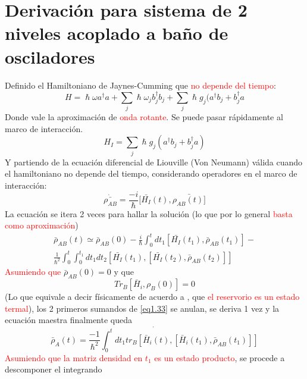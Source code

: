 \documentclass{book}
\begin{document}
\section{Derivación para sistema de 2 niveles acoplado a baño de osciladores}
Definido el Hamiltoniano de Jaynes-Cumming que \textcolor{Red}{no depende del tiempo}: 
\begin{equation}\label{eq1.30}H=\hslash\omega a^\dag a+\sum_j \hslash \omega_jb_j^\dag b_j+\sum_j \hslash g_j(a^\dag b_j+b_j^\dag a\end{equation}
Donde vale la aproximación de \textcolor{Red}{onda rotante}. Se puede pasar rápidamente al marco de interacción.
\begin{equation}\label{eq1.31}H_I=\sum_j \hslash g_j(a^\dag b_j+b_j^\dag a) \end{equation} Y partiendo de la ecuación diferencial de Liouville (Von Neumann) válida cuando el hamiltoniano no depende del tiempo, considerando operadores en el marco de interacción:
\begin{equation}\label{eq1.32}\dot{\bar{\rho_{AB}}}=\frac{-i}{\hslash}[\bar{H_I}(t),\bar{\rho_{AB}(t)]}\end{equation}
La ecuación se itera 2 veces para hallar la solución (lo que por lo general \textcolor{Red}{basta como aproximación})
\begin{equation}\label{eq1.33} \begin{aligned}\bar{\rho}_{AB}(t)\simeq\bar\rho_{AB}(0)-\frac{i}{\hslash}\int_0^t dt_1[\bar{H_I}(t_1),\bar{\rho}_{AB}(t_1)]- \\ \frac{1}{\hslash^2}\int_0^t\int_0^{t_1}dt_1dt_2[\bar{H_I}(t_1),[\bar{H_I}(t_2),\bar{\rho}_{AB}(t_2)]]\end{aligned}\end{equation}
\textcolor{Red}{Asumiendo que} $\bar{\rho}_{AB}(0)=0$ y que 
\begin{equation}\label{eq1.34}Tr_B[\bar{H}_i,\rho_B(0)]=0\end{equation}
(Lo que equivale a decir físicamente de acuerdo a \textcolor{red}{\cite{Orszag}}, que \textcolor{Red}{el reservorio es un estado termal}), los 2 primeros sumandos de \textcolor{blue}{\ref{eq1.33}} se anulan, se deriva 1 vez y la ecuación maestra finalmente queda
\begin{equation}\label{eq1.35}\dot{\bar{\rho}_A(t)=\frac{-1}{\hslash^2}\int_0^tdt_1 tr_B[\bar{H}_i(t),[\bar{H}_i(t_1),\bar{\rho}_{AB}(t_1)]]}\end{equation}
\textcolor{Red}{Asumiendo que la matriz densidad en $t_1$ es un estado producto}, se procede a descomponer el integrando 
\end{document}
